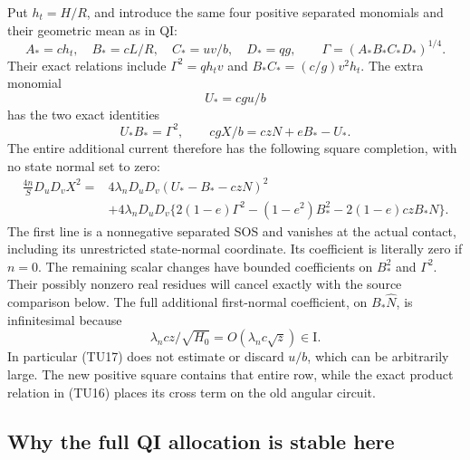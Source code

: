 Put $h_t=H/R$, and introduce the same four positive separated
monomials and their geometric mean as in QI:
\[
 A_*=ch_t,\quad B_*=cL/R,\quad C_*=uv/b,\quad
 D_*=qg,\qquad \Gamma=(A_*B_*C_*D_*)^{1/4}.
                                                               \tag{TU15}
\]
Their exact relations include
$\Gamma^2=qh_tv$ and $B_*C_*=(c/g)v^2h_t$.
The extra monomial
\[
                   U_*=cgu/b
\]
has the two exact identities
\[
       U_*B_*=\Gamma^2,\qquad
       cgX/b=czN+eB_*-U_*.
                                                               \tag{TU16}
\]
The entire additional current therefore has the following square
completion, with no state normal set to zero:
\begin{align*}
 \frac{4n}{S}D_uD_vX^2
 ={}&4\lambda_nD_uD_v(U_*-B_*-czN)^2\\
 &+4\lambda_nD_uD_v
   \{2(1-e)\Gamma^2-(1-e^2)B_*^2
                         -2(1-e)czB_*N\}.
                                                               \tag{TU17}
\end{align*}
The first line is a nonnegative separated SOS and vanishes at the
actual contact, including its unrestricted state-normal coordinate.
Its coefficient is literally zero if $n=0$.  The remaining scalar
changes have bounded coefficients on $B_*^2$ and $\Gamma^2$.
Their possibly nonzero real residues will cancel exactly with
the source comparison below.  The full additional first-normal coefficient, on
$B_*\widehat N$, is infinitesimal because
\[
       \lambda_n cz/\sqrt{H_0}=O(\lambda_n c\sqrt z)
                                            \in\mathrm I.
                                                               \tag{TU18}
\]
In particular (TU17) does not estimate or discard $u/b$, which can
be arbitrarily large.  The new positive square contains that entire
row, while the exact product relation in (TU16) places its cross
term on the old angular circuit.

\subsection{Why the full QI allocation is stable here}

